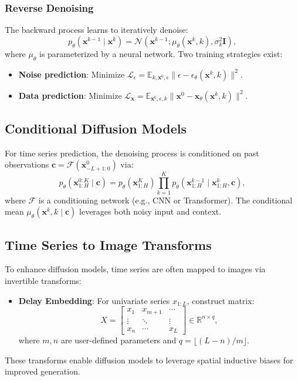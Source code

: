\subsubsection{Reverse Denoising}
The backward process learns to iteratively denoise:
\begin{equation}
	p_\theta(\mathbf{x}^{k-1} \mid \mathbf{x}^k) = \mathcal{N}(\mathbf{x}^{k-1}; \mu_\theta(\mathbf{x}^k, k), \sigma_k^2\mathbf{I}),
\end{equation}
where $\mu_\theta$ is parameterized by a neural network. Two training strategies exist:
\begin{itemize}
	\item \textbf{Noise prediction}: Minimize $\mathcal{L}_\epsilon = \mathbb{E}_{k,\mathbf{x}^0,\epsilon} \|\epsilon - \epsilon_\theta(\mathbf{x}^k, k)\|^2$.
	\item \textbf{Data prediction}: Minimize $\mathcal{L}_{\mathbf{x}} = \mathbb{E}_{\mathbf{x}^0,\epsilon,k} \|\mathbf{x}^0 - \mathbf{x}_\theta(\mathbf{x}^k, k)\|^2$.
\end{itemize}

\subsection{Conditional Diffusion Models}
For time series prediction, the denoising process is conditioned on past observations $\mathbf{c} = \mathcal{F}(\mathbf{x}_{-L+1:0}^0)$ via:
\begin{equation}
	p_\theta(\mathbf{x}_{1:H}^{0:K} \mid \mathbf{c}) = p_\theta(\mathbf{x}_{1:H}^K) \prod_{k=1}^K p_\theta(\mathbf{x}_{1:H}^{k-1} \mid \mathbf{x}_{1:H}^k, \mathbf{c}),
\end{equation}
where $\mathcal{F}$ is a conditioning network (e.g., CNN or Transformer). The conditional mean $\mu_\theta(\mathbf{x}^k, k \mid \mathbf{c})$ leverages both noisy input and context.

\subsection{Time Series to Image Transforms}
To enhance diffusion models, time series are often mapped to images via invertible transforms:
\begin{itemize}
	\item \textbf{Delay Embedding}: For univariate series $x_{1:L}$, construct matrix:
	\begin{equation}
		X = \begin{bmatrix}
			x_1 & x_{m+1} & \cdots \\
			\vdots & \ddots & \vdots \\
			x_n & \cdots & x_L
		\end{bmatrix} \in \mathbb{R}^{n \times q},
	\end{equation}
	where $m,n$ are user-defined parameters and $q = \lfloor (L-n)/m \rfloor$.
	
\end{itemize}
These transforms enable diffusion models to leverage spatial inductive biases for improved generation.